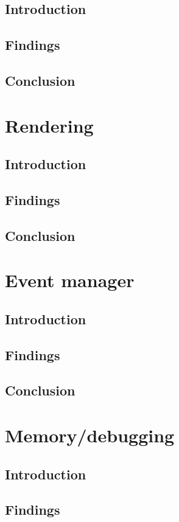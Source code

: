 \documentclass{projdoc}
\begin{document}
    \subsection{Introduction}
    \subsection{Findings}
    \subsection{Conclusion}
\section{Rendering}
    \subsection{Introduction}
    \subsection{Findings}
    \subsection{Conclusion}
\section{Event manager}
    \subsection{Introduction}
    \subsection{Findings}
    \subsection{Conclusion}
\section{Memory/debugging}
    \subsection{Introduction}
    \subsection{Findings}
\end{document}
